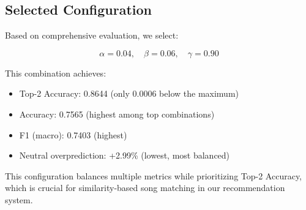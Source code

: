 \subsection{Selected Configuration}
\label{subsec:selected_config}

Based on comprehensive evaluation, we select:

$$\alpha = 0.04, \quad \beta = 0.06, \quad \gamma = 0.90$$

This combination achieves:
\begin{itemize}
    \item Top-2 Accuracy: 0.8644 (only 0.0006 below the maximum)
    \item Accuracy: 0.7565 (highest among top combinations)
    \item F1 (macro): 0.7403 (highest)
    \item Neutral overprediction: +2.99\% (lowest, most balanced)
\end{itemize}

This configuration balances multiple metrics while prioritizing Top-2 Accuracy, which is crucial for similarity-based song matching in our recommendation system.

